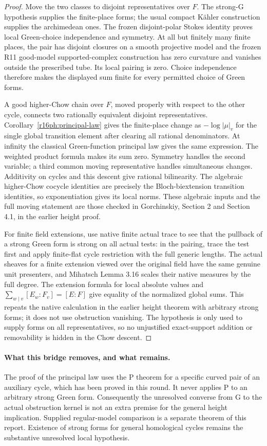 \begin{proof}
Move the two classes to disjoint representatives over $F$.
The strong-G hypothesis supplies the finite-place forms; the
usual compact K\"ahler construction supplies the archimedean ones.
The frozen disjoint-polar Stokes identity proves local Green-choice
independence and symmetry.  At all but finitely many finite places,
the pair has disjoint closures on a smooth projective model and
the frozen R11 good-model supported-complex construction has zero
curvature and vanishes outside the prescribed tube.  Its local
pairing is zero.  Choice independence therefore makes the displayed
sum finite for every permitted choice of Green forms.

A good higher-Chow chain over $F$, moved properly with respect to
the other cycle, connects two rationally equivalent disjoint
representatives.  Corollary~\ref{r16ph:principal-law} gives the
finite-place change as $-\log|\mu|_v$ for the single global
transition element after clearing all rational denominators.
At infinity the classical Green-function principal law gives the
same expression.  The weighted product formula makes its sum zero.
Symmetry handles the second variable; a third common moving
representative handles simultaneous changes.  Additivity on cycles
and this descent give rational bilinearity.  The algebraic
higher-Chow cocycle identities are precisely the Bloch-biextension
transition identities, so exponentiation gives its local norms.
These algebraic inputs and the full moving statement are those
checked in Gorchinskiy, Section 2 and Section 4.1, in the earlier
height proof.

For finite field extensions, use native finite actual trace to
see that the pullback of a strong Green form is strong on all
actual tests: in the pairing, trace the test first and apply
finite-flat cycle restriction with the full generic lengths.
The actual sheaves for a finite extension viewed over the original
field have the same genuine unit presenters, and Mihatsch
Lemma 3.16 scales their native measures by the full degree.
The extension formula for local absolute values and
$\sum_{w\mid v}[E_w:F_v]=[E:F]$ give equality of the normalized
global sums.  This repeats the native calculation in the earlier
height theorem with arbitrary strong forms; it does not use
obstruction vanishing.  The hypothesis is only used to supply
forms on all representatives, so no unjustified exact-support
addition or removability is hidden in the Chow descent.
\end{proof}

\paragraph{What this bridge removes, and what remains.}
The proof of the principal law uses the P theorem for a specific
curved pair of an auxiliary cycle, which has been proved in this
round.  It never applies P to an arbitrary strong Green form.
Consequently the unresolved converse from G to the actual
obstruction kernel is not an extra premise for the general
height implication.  Supplied regular-model comparison is a
separate theorem of this report.  Existence of strong forms for
general homological cycles remains the substantive unresolved
local hypothesis.
